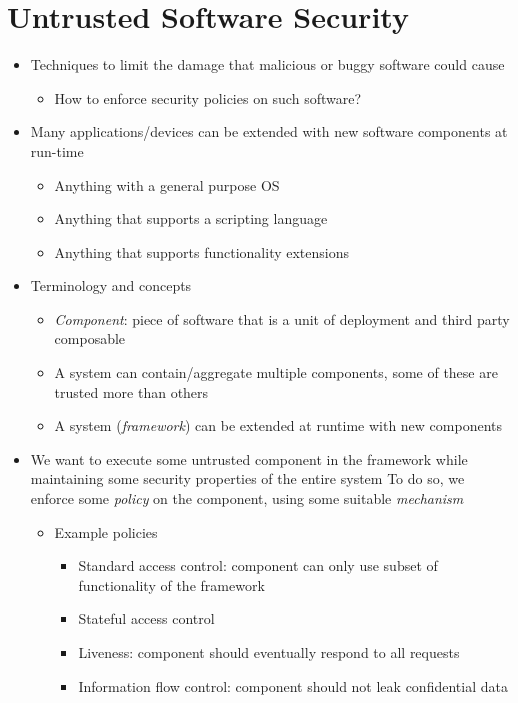 \documentclass[12pt,titlepage,a4paper]{report}
\begin{document}
		\chapter{Untrusted Software Security}
			\begin{itemize}
				\item[\textrightarrow] Techniques to limit the damage that malicious or buggy software could cause
				\begin{itemize}
					\item How to enforce security policies on such software?
				\end{itemize}
				\item Many applications/devices can be extended with new software components at run-time
				\begin{itemize}
					\item Anything with a general purpose OS
					\item Anything that supports a scripting language
					\item Anything that supports functionality extensions
				\end{itemize}
				\item Terminology and concepts
				\begin{itemize}
					\item \textit{Component}: piece of software that is a unit of deployment and third party composable
					\item A system can contain/aggregate multiple components, some of these are trusted more than others
					\item A system (\textit{framework}) can be extended at runtime with new components
				\end{itemize}
				\item We want to execute some untrusted component in the framework while maintaining some security properties of the entire system
				\subitem To do so, we enforce some \emph{policy} on the component, using some suitable \emph{mechanism}
				\begin{itemize}
					\item Example policies
					\begin{itemize}
						\item Standard access control: component can only use subset of functionality of the framework
						\item Stateful access control
						\item Liveness: component should eventually respond to all requests
						\item Information flow control: component should not leak confidential data

\end{itemize}
\end{itemize}
\end{itemize}
\end{document}
